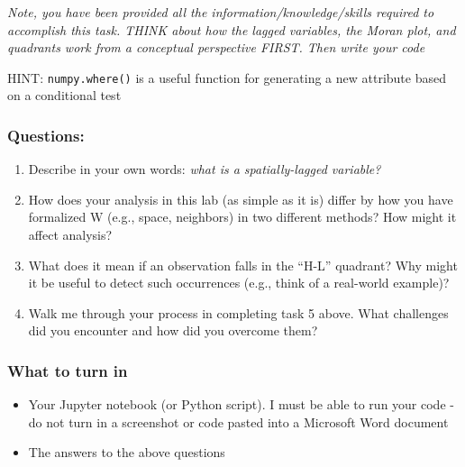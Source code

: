 \documentclass[]{article}
\begin{document}
\emph{Note, you have been provided all the information/knowledge/skills
required to accomplish this task. THINK about how the lagged variables,
the Moran plot, and quadrants work from a conceptual perspective FIRST.
Then write your code}

HINT: \texttt{numpy.where()} is a useful function for generating a new
attribute based on a conditional test

\hypertarget{questions}{%
\subsubsection{Questions:}\label{questions}}

\begin{enumerate}
\def\labelenumi{\arabic{enumi}.}
\item
  Describe in your own words: \emph{what is a spatially-lagged
  variable?}
\item
  How does your analysis in this lab (as simple as it is) differ by how
  you have formalized W (e.g., space, neighbors) in two different
  methods? How might it affect analysis?
\item
  What does it mean if an observation falls in the ``H-L'' quadrant? Why
  might it be useful to detect such occurrences (e.g., think of a
  real-world example)?
\item
  Walk me through your process in completing task 5 above. What
  challenges did you encounter and how did you overcome them?
\end{enumerate}

\hypertarget{what-to-turn-in}{%
\subsubsection{What to turn in}\label{what-to-turn-in}}

\begin{itemize}
\item
  Your Jupyter notebook (or Python script). I must be able to run your
  code - do not turn in a screenshot or code pasted into a Microsoft
  Word document
\item
  The answers to the above questions
\end{itemize}
\end{document}

